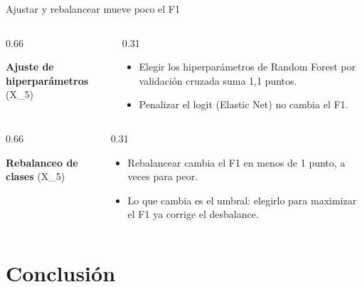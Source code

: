 \documentclass[aspectratio=169, 10pt]{beamer}
\begin{document}
\begin{frame}{Ajustar y rebalancear mueve poco el F1}
  \vspace{3mm}
  \begin{columns}[c, onlytextwidth]
    \begin{column}{0.66\textwidth}
      {\footnotesize\textbf{Ajuste de hiperpar\'ametros} (X\_5)\par\smallskip}
      \resizebox{\linewidth}{!}{}
    \end{column}
    \begin{column}{0.31\textwidth}
      \footnotesize
      \begin{itemize}
        \item Elegir los hiperpar\'ametros de Random Forest por validaci\'on cruzada suma 1,1 puntos.
        \item Penalizar el logit (Elastic Net) no cambia el F1.
      \end{itemize}
    \end{column}
  \end{columns}
  \vspace{3mm}
  \begin{columns}[c, onlytextwidth]
    \begin{column}{0.66\textwidth}
      {\footnotesize\textbf{Rebalanceo de clases} (X\_5)\par\smallskip}
      \centering
      {\scriptsize }
    \end{column}
    \begin{column}{0.31\textwidth}
      \footnotesize
      \begin{itemize}
        \item Rebalancear cambia el F1 en menos de 1 punto, a veces para peor.
        \item Lo que cambia es el umbral: elegirlo para maximizar el F1 ya corrige el desbalance.
      \end{itemize}
    \end{column}
  \end{columns}
\end{frame}

\section{Conclusi\'on}
\end{document}
